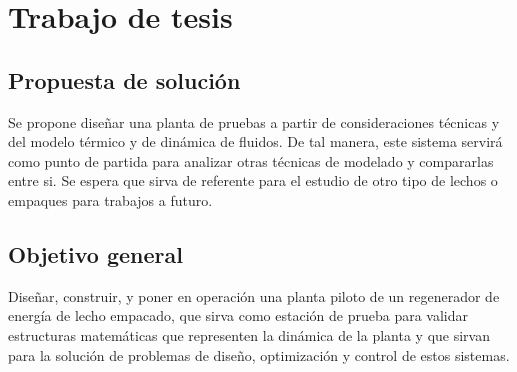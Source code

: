 \documentclass[12pt,letterpaper,final]{article}%
\begin{document}
\newpage
\section{Trabajo de tesis}
\subsection{Propuesta de soluci\'on} 
Se propone dise\~nar una planta de pruebas a partir de consideraciones t\'ecnicas y del modelo t\'ermico y de din\'amica de fluidos. De tal manera, este sistema servir\'a como punto de partida para analizar otras t\'ecnicas de modelado y compararlas entre si. Se espera que sirva de referente para el estudio de otro tipo de lechos o empaques para trabajos a futuro.
\subsection{Objetivo general}
Diseñar, construir, y poner en operaci\'on una planta piloto de un regenerador de energ\'ia de lecho empacado, que sirva como estaci\'on de prueba para validar estructuras matem\'aticas que representen la din\'amica de la
planta y que sirvan para la soluci\'on de problemas de diseño, optimizaci\'on y control de estos sistemas.
\end{document}
